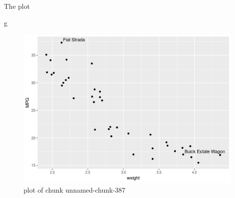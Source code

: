 \documentclass[ignorenonframetext,]{beamer}
\newenvironment{Shaded}{\begin{snugshade}}{\end{snugshade}}
\newcommand{\NormalTok}[1]{#1}
\begin{document}
\begin{frame}[fragile]{The plot}
\protect\hypertarget{the-plot-6}{}

\begin{Shaded}
\begin{Highlighting}[]
\NormalTok{g}
\end{Highlighting}
\end{Shaded}

\begin{figure}
\centering
\includegraphics{figure/unnamed-chunk-387-1.png}
\caption{plot of chunk unnamed-chunk-387}
\end{figure}

\end{frame}
\end{document}
